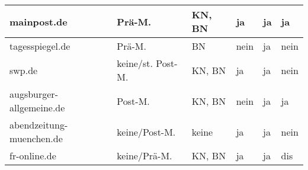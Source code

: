 \begin{table}
\begin{tabular}{p{28mm}*{5}{l}}
mainpost.de
& Prä-M.
& KN, BN
& ja
& ja
& ja
\\*\midrule

tagesspiegel.de
& Prä-M.
& BN
& nein
& ja
& nein
\\*\midrule

swp.de
& keine/st. Post-M.
& KN, BN
& ja
& ja
& nein
\\*\midrule

augsburger-allgemeine.de
& Post-M.
& KN, BN
& nein
& ja
& ja
\\*\midrule

abendzeitung-muenchen.de
& keine/Post-M.
& keine
& ja
& ja
& nein

\\*\midrule

fr-online.de
& keine/Prä-M.
& KN, BN
& ja
& ja
& dis

\\*\bottomrule

  \end{tabular}
\end{table}

